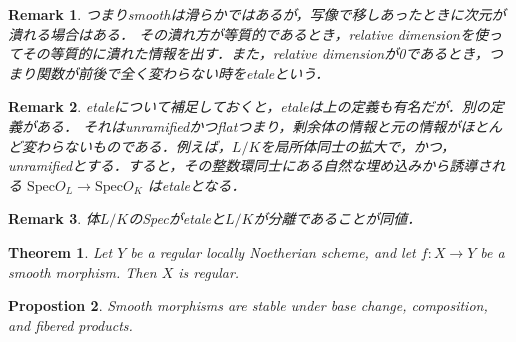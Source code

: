 \documentclass{ujarticle}
\newtheorem{thm}{Theorem}[section]
\newtheorem{prop}[thm]{Propostion}
\newtheorem*{rem}{Remark}
\begin{document}
\begin{rem}
 つまりsmoothは滑らかではあるが，写像で移しあったときに次元が潰れる場合はある．
 その潰れ方が等質的であるとき，relative dimensionを使ってその等質的に潰れた情報を出す．また，relative dimensionが0であるとき，つまり関数が前後で全く変わらない時をetaleという．
\end{rem}
\begin{rem}
 etaleについて補足しておくと，etaleは上の定義も有名だが．別の定義がある．
 それはunramifiedかつflatつまり，剰余体の情報と元の情報がほとんど変わらないものである．例えば，$L/K$を局所体同士の拡大で，かつ，unramifiedとする．すると，その整数環同士にある自然な埋め込みから誘導される $\mathrm{Spec}O_L \to \mathrm{Spec}O_K$
 はetaleとなる．
\end{rem}
\begin{rem}
 体$L/K$のSpecがetaleと$L/K$が分離であることが同値．
\end{rem}

\begin{thm}

 Let $Y$ be a regular locally Noetherian scheme, and let $f : X →
Y$ be a smooth morphism. Then $X$ is regular.

\end{thm}

\begin{prop}

Smooth morphisms are stable under base change, composition,
and fibered products.

\end{prop}
\end{document}
